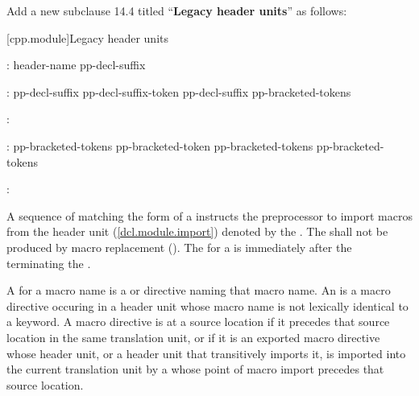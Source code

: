 Add a new subclause 14.4 titled ``\textbf{Legacy header units}'' as follows:

\setcounter{section}{3}
[cpp.module]{Legacy header units}%
\resetalinea[0]

\begin{std.txt}
\color{addclr}
\begin{bnf}
:\br
   header-name pp-decl-suffix\opt{} \terminal{;}
\end{bnf}

\begin{bnf}
:\br
  pp-decl-suffix\opt{} pp-decl-suffix-token\br
  pp-decl-suffix\opt{} \terminal{[} pp-bracketed-tokens \terminal{]}
\end{bnf}

\begin{bnf}
:\br
\end{bnf}

\begin{bnf}
:\br
  pp-bracketed-tokens\opt{} pp-bracketed-token\br
  pp-bracketed-tokens\opt{} \terminal{[} pp-bracketed-tokens \terminal{]}
\end{bnf}

\begin{bnf}
:\br
\end{bnf}

\color{addclr}
\alinea
A sequence of  matching the form
of a 
instructs the preprocessor to import macros from the header unit
(\ref{dcl.module.import}) denoted by the .
The \tcode{;}  shall not be produced by
macro replacement ().
The  for a  is
immediately after the \tcode{;} terminating the .

\color{addclr}
\alinea
A  for a macro name is a  or
 directive naming that macro name.
An  is
a macro directive occuring in a header unit
\color{addclr}
whose macro name is not lexically identical to a keyword.
A macro directive is  at a source location
if it precedes that source location in the same translation unit, or
if it is an exported macro directive whose header unit,
or a header unit that
\color{addclr}
transitively imports it,
is imported into the current translation unit by a 
whose point of macro import precedes that source location.


\end{std.txt}
